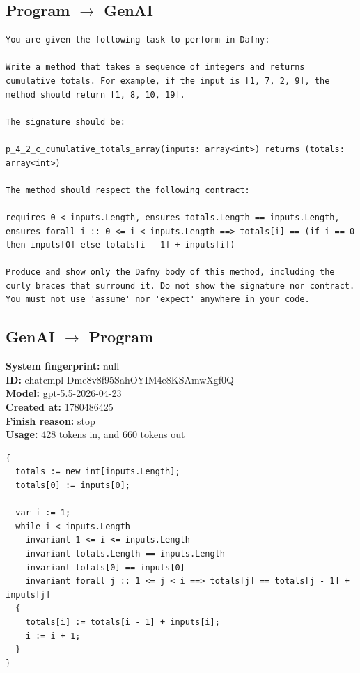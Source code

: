 \documentclass{article}
\begin{document}
\subsection*{Program $\rightarrow$ GenAI}
\begin{lstlisting}
You are given the following task to perform in Dafny:

Write a method that takes a sequence of integers and returns cumulative totals. For example, if the input is [1, 7, 2, 9], the method should return [1, 8, 10, 19].

The signature should be:

p_4_2_c_cumulative_totals_array(inputs: array<int>) returns (totals: array<int>)

The method should respect the following contract:

requires 0 < inputs.Length, ensures totals.Length == inputs.Length, ensures forall i :: 0 <= i < inputs.Length ==> totals[i] == (if i == 0 then inputs[0] else totals[i - 1] + inputs[i])

Produce and show only the Dafny body of this method, including the curly braces that surround it. Do not show the signature nor contract. You must not use 'assume' nor 'expect' anywhere in your code.
\end{lstlisting}
\subsection*{GenAI $\rightarrow$ Program}
\textbf{System fingerprint: }null
\\\textbf{ID: }chatcmpl-Dme8v8f95SahOYIM4e8KSAmwXgf0Q
\\\textbf{Model: }gpt-5.5-2026-04-23
\\\textbf{Created at: }1780486425
\\\textbf{Finish reason: }stop
\\\textbf{Usage: }428 tokens in, and 660 tokens out
\begin{lstlisting}
{
  totals := new int[inputs.Length];
  totals[0] := inputs[0];

  var i := 1;
  while i < inputs.Length
    invariant 1 <= i <= inputs.Length
    invariant totals.Length == inputs.Length
    invariant totals[0] == inputs[0]
    invariant forall j :: 1 <= j < i ==> totals[j] == totals[j - 1] + inputs[j]
  {
    totals[i] := totals[i - 1] + inputs[i];
    i := i + 1;
  }
}
\end{lstlisting}
\end{document}
